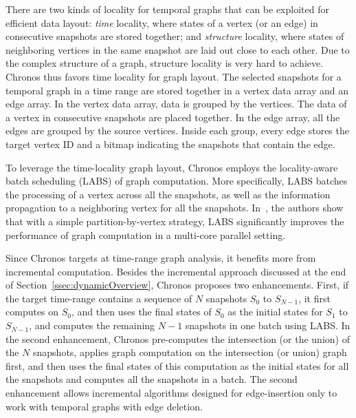 \documentclass{svjour3}
\begin{document}
\vspace{2mm}

 There are two kinds of locality for temporal graphs that can be exploited for efficient data layout: \emph{time} locality, where states of a vertex (or an edge) in consecutive snapshots are stored together; and \emph{structure} locality, where states of neighboring vertices in the same snapshot are laid out close to each other. Due to the complex structure of a graph, structure locality is very hard to achieve. Chronos thus favors time locality for graph layout. The selected snapshots for a temporal graph in a time range are stored together in a vertex data array and an edge array. In the vertex data array, data is grouped by the vertices. The data of a vertex in consecutive snapshots are placed together. In the edge array, all the edges are grouped by the source vertices. Inside each group, every edge stores the target vertex ID and a bitmap indicating the snapshots that contain the edge. 

\vspace{2mm}

 To leverage the time-locality graph layout, Chronos employs the locality-aware batch scheduling (LABS) of graph computation. More specifically, LABS batches the processing of a vertex across all the snapshots, as well as the information propagation to a neighboring vertex for all the snapshots. %
In~\cite{chronos}, the authors show that with a simple partition-by-vertex strategy, LABS significantly improves the performance of graph computation in a multi-core parallel setting.

\vspace{2mm}

 Since Chronos targets at time-range graph analysis, it benefits more from incremental computation. Besides the incremental approach discussed at the end of Section~\ref{ssec:dynamicOverview}, Chronos proposes two enhancements. First, if the target time-range contains a sequence of $N$ snapshots $S_0$ to $S_{N-1}$, it first computes on $S_0$, and then uses the final states of $S_0$ as the initial states for $S_1$ to $S_{N-1}$, and computes the remaining $N-1$ snapshots in one batch using LABS. In the second enhancement, Chronos pre-computes the intersection (or the union) of the $N$ snapshots, applies graph computation on the intersection (or union) graph first, and then uses the final states of this computation as the initial states for all the snapshots and computes all the snapshots in a batch. The second enhancement allows incremental algorithms designed for edge-insertion only to work with temporal graphs with edge deletion.
\end{document}
